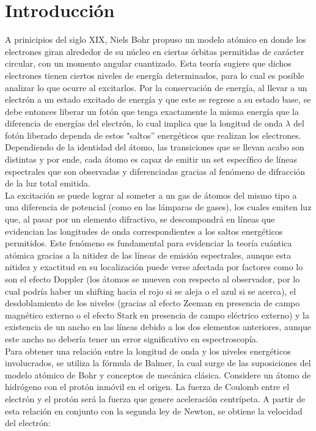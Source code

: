 \documentclass[%
 reprint,
 amsmath,amssymb,
 aps,
]{revtex4-1}
\begin{document}
\section{Introducción}

A prinicipios del siglo XIX, Niels Bohr propuso un modelo atómico en donde los electrones giran alrededor de su núcleo en ciertas órbitas permitidas de carácter circular, con un momento angular cuantizado. Esta teoría sugiere que dichos electrones tienen ciertos niveles de energía determinados, para lo cual es posible analizar lo que ocurre al excitarlos. Por la conservación de energía, al llevar a un electrón a un estado excitado de energía y que este se regrese a su estado base, se debe entonces liberar un fotón que tenga exactamente la misma energía que la diferencia de energías del electrón, lo cual implica que la longitud de onda $\lambda$ del fotón liberado dependa de estos "saltos'' energéticos que realizan los electrones. Dependiendo de la identidad del átomo, las transiciones que se llevan acabo son distintas y por ende, cada átomo es capaz de emitir un set específico de líneas espectrales que son observadas y diferenciadas gracias al fenómeno de difracción de la luz total emitida. \\
La excitación se puede lograr al someter a un gas de átomos del mismo tipo a una diferencia de potencial (como en las lámparas de gases), los cuales emiten luz que, al pasar por un elemento difractivo, se descompondrá en líneas que evidencian las longitudes de onda correspondientes a los saltos energéticos permitidos. Este fenómeno es fundamental para evidenciar la teoría cuántica atómica gracias a la nitidez de las líneas de emisión espectrales, aunque esta nitidez y exactitud en su localización puede verse afectada por factores como lo son el efecto Doppler (los átomos se mueven con respecto al observador, por lo cual podría haber un shifting hacia el rojo si se aleja o el azul si se acerca), el desdoblamiento de los niveles (gracias al efecto Zeeman en presencia de campo magnético externo o el efecto Stark en presencia de campo eléctrico externo) y la existencia de un ancho en las líneas debido a los dos elementos anteriores, aunque este ancho no debería tener un error significativo en espectroscopía. \cite{width}\\
Para obtener una relación entre la longitud de onda y los niveles energéticos involucrados, se utiliza la fórmula de Balmer, la cual surge de las suposiciones del modelo atómico de Bohr y conceptos de mecánica clásica. Considere un átomo de hidrógeno con el protón inmóvil en el origen. La fuerza de Coulomb entre el electrón y el protón será la fuerza que genere aceleración centrípeta. A partir de esta relación en conjunto con la segunda ley de Newton, se obtiene la velocidad del electrón:
\end{document}
